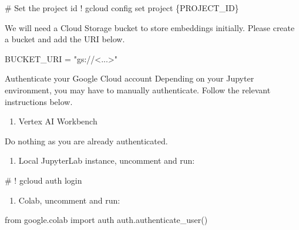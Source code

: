 \documentclass[
  letterpaper,
  DIV=11,
  numbers=noendperiod]{scrreprt}
\newenvironment{Shaded}{\begin{snugshade}}{\end{snugshade}}
\newcommand{\BuiltInTok}[1]{\textcolor[rgb]{0.00,0.23,0.31}{#1}}
\newcommand{\CommentTok}[1]{\textcolor[rgb]{0.37,0.37,0.37}{#1}}
\newcommand{\ImportTok}[1]{\textcolor[rgb]{0.00,0.46,0.62}{#1}}
\newcommand{\NormalTok}[1]{\textcolor[rgb]{0.00,0.23,0.31}{#1}}
\newcommand{\OperatorTok}[1]{\textcolor[rgb]{0.37,0.37,0.37}{#1}}
\newcommand{\StringTok}[1]{\textcolor[rgb]{0.13,0.47,0.30}{#1}}
\providecommand{\tightlist}{%
  \setlength{\itemsep}{0pt}\setlength{\parskip}{0pt}}\usepackage{longtable,booktabs,array}
\begin{document}
\begin{Shaded}
\begin{Highlighting}[]
\CommentTok{\# Set the project id}
\OperatorTok{!}\NormalTok{ gcloud config }\BuiltInTok{set}\NormalTok{ project \{PROJECT\_ID\}}
\end{Highlighting}
\end{Shaded}

We will need a Cloud Storage bucket to store embeddings initially.
Please create a bucket and add the URI below.

\begin{Shaded}
\begin{Highlighting}[]
\NormalTok{BUCKET\_URI }\OperatorTok{=} \StringTok{"gs://\textless{}...\textgreater{}"}
\end{Highlighting}
\end{Shaded}

Authenticate your Google Cloud account Depending on your Jupyter
environment, you may have to manually authenticate. Follow the relevant
instructions below.

\begin{enumerate}
\def\labelenumi{\arabic{enumi}.}
\tightlist
\item
  Vertex AI Workbench
\end{enumerate}

Do nothing as you are already authenticated.

\begin{enumerate}
\def\labelenumi{\arabic{enumi}.}
\setcounter{enumi}{1}
\tightlist
\item
  Local JupyterLab instance, uncomment and run:
\end{enumerate}

\begin{Shaded}
\begin{Highlighting}[]
\CommentTok{\# ! gcloud auth login}
\end{Highlighting}
\end{Shaded}

\begin{enumerate}
\def\labelenumi{\arabic{enumi}.}
\setcounter{enumi}{2}
\tightlist
\item
  Colab, uncomment and run:
\end{enumerate}

\begin{Shaded}
\begin{Highlighting}[]
\ImportTok{from}\NormalTok{ google.colab }\ImportTok{import}\NormalTok{ auth}
\NormalTok{auth.authenticate\_user()}
\end{Highlighting}
\end{Shaded}
\end{document}
